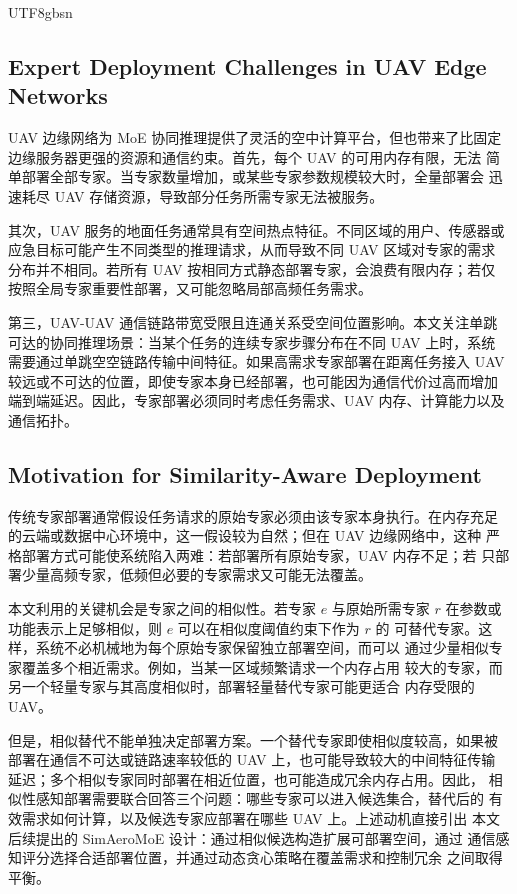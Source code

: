 \documentclass[conference]{IEEEtran}
\begin{document}
\begin{CJK*}{UTF8}{gbsn}
\subsection{Expert Deployment Challenges in UAV Edge Networks}
\label{sec:bg_uav_challenge}

UAV 边缘网络为 MoE 协同推理提供了灵活的空中计算平台，但也带来了比固定
边缘服务器更强的资源和通信约束。首先，每个 UAV 的可用内存有限，无法
简单部署全部专家。当专家数量增加，或某些专家参数规模较大时，全量部署会
迅速耗尽 UAV 存储资源，导致部分任务所需专家无法被服务。

其次，UAV 服务的地面任务通常具有空间热点特征。不同区域的用户、传感器或
应急目标可能产生不同类型的推理请求，从而导致不同 UAV 区域对专家的需求
分布并不相同。若所有 UAV 按相同方式静态部署专家，会浪费有限内存；若仅
按照全局专家重要性部署，又可能忽略局部高频任务需求。

第三，UAV-UAV 通信链路带宽受限且连通关系受空间位置影响。本文关注单跳
可达的协同推理场景：当某个任务的连续专家步骤分布在不同 UAV 上时，系统
需要通过单跳空空链路传输中间特征。如果高需求专家部署在距离任务接入 UAV
较远或不可达的位置，即使专家本身已经部署，也可能因为通信代价过高而增加
端到端延迟。因此，专家部署必须同时考虑任务需求、UAV 内存、计算能力以及
通信拓扑。

\subsection{Motivation for Similarity-Aware Deployment}
\label{sec:bg_similarity_motivation}

传统专家部署通常假设任务请求的原始专家必须由该专家本身执行。在内存充足
的云端或数据中心环境中，这一假设较为自然；但在 UAV 边缘网络中，这种
严格部署方式可能使系统陷入两难：若部署所有原始专家，UAV 内存不足；若
只部署少量高频专家，低频但必要的专家需求又可能无法覆盖。

本文利用的关键机会是专家之间的相似性。若专家 $e$ 与原始所需专家 $r$
在参数或功能表示上足够相似，则 $e$ 可以在相似度阈值约束下作为 $r$ 的
可替代专家。这样，系统不必机械地为每个原始专家保留独立部署空间，而可以
通过少量相似专家覆盖多个相近需求。例如，当某一区域频繁请求一个内存占用
较大的专家，而另一个轻量专家与其高度相似时，部署轻量替代专家可能更适合
内存受限的 UAV。

但是，相似替代不能单独决定部署方案。一个替代专家即使相似度较高，如果被
部署在通信不可达或链路速率较低的 UAV 上，也可能导致较大的中间特征传输
延迟；多个相似专家同时部署在相近位置，也可能造成冗余内存占用。因此，
相似性感知部署需要联合回答三个问题：哪些专家可以进入候选集合，替代后的
有效需求如何计算，以及候选专家应部署在哪些 UAV 上。上述动机直接引出
本文后续提出的 SimAeroMoE 设计：通过相似候选构造扩展可部署空间，通过
通信感知评分选择合适部署位置，并通过动态贪心策略在覆盖需求和控制冗余
之间取得平衡。



\end{CJK*}
\end{document}
